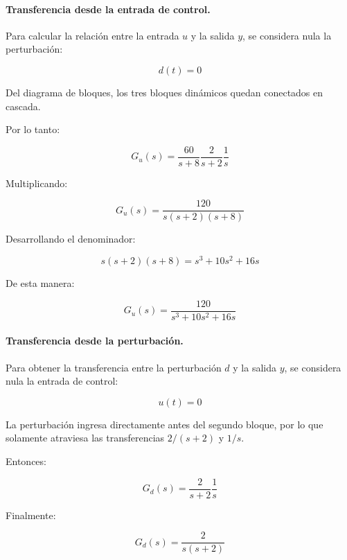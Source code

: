 \documentclass[12pt,a4paper]{article}
\begin{document}
\paragraph{Transferencia desde la entrada de control.} Para calcular la relación entre la entrada $u$ y la salida $y$, se considera nula la perturbación:

\begin{equation}d(t)=0\end{equation}

Del diagrama de bloques, los tres bloques dinámicos quedan conectados en cascada.

Por lo tanto:

\begin{equation}G_u(s)=\frac{60}{s+8} \frac{2}{s+2} \frac{1}{s}\end{equation}

Multiplicando:

\begin{equation}\boxed{G_u(s)=\frac{120}{s(s+2)(s+8)}}\end{equation}

Desarrollando el denominador:

\begin{equation}s(s+2)(s+8)=s^3+10s^2+16s\end{equation}

De esta manera:

\begin{equation}G_u(s)=\frac{120}{s^3+10s^2+16s}\end{equation}
\paragraph{Transferencia desde la perturbación.} Para obtener la transferencia entre la perturbación $d$ y la salida $y$, se considera nula la entrada de control:

\begin{equation}u(t)=0\end{equation}

La perturbación ingresa directamente antes del segundo bloque, por lo que solamente atraviesa las transferencias $2/(s+2)$ y $1/s$.

Entonces:

\begin{equation}G_d(s)=\frac{2}{s+2}\frac{1}{s}\end{equation}

Finalmente:

\begin{equation}\boxed{G_d(s)=\frac{2}{s(s+2)}}\end{equation}
\end{document}
